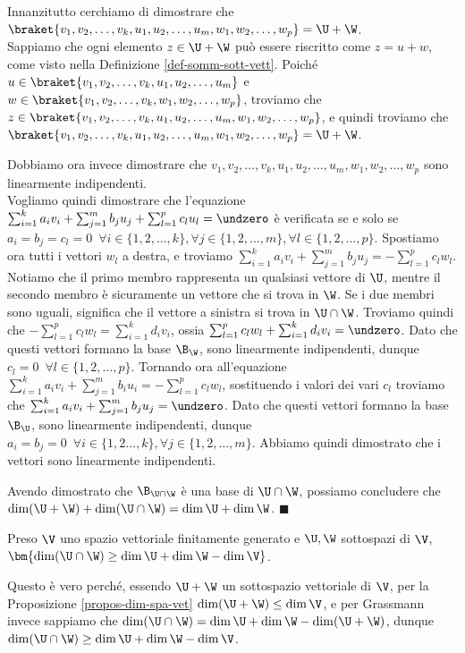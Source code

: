 \documentclass[11pt, a4paper, titlepage, oneside]{scrbook}
\begin{document}
Innanzitutto cerchiamo di dimostrare che $\braket{v_1, v_2, \ldots, v_k, u_1, u_2, \ldots, u_m, w_1, w_2, \ldots, w_p} = \U + \W$.\\
Sappiamo che ogni elemento $z \in \U + \W$ può essere riscritto come $z = u + w$, come visto nella Definizione \ref{def-somm-sott-vett}. Poiché $u \in \braket{v_1, v_2, \ldots, v_k, u_1, u_2, \ldots, u_m}$ e \mbox{$w \in \braket{v_1, v_2, \ldots, v_k, w_1, w_2, \ldots, w_p}$}, troviamo che $z \in \braket{v_1, v_2, \ldots, v_k, u_1, u_2, \ldots, u_m, w_1, w_2, \ldots, w_p}$, e quindi troviamo che \mbox{$\braket{v_1, v_2, \ldots, v_k, u_1, u_2, \ldots, u_m, w_1, w_2, \ldots, w_p} = \U + \W$}.

Dobbiamo ora invece dimostrare che $v_1, v_2, \ldots, v_k, u_1, u_2, \ldots, u_m, w_1, w_2, \ldots, w_p$ sono linearmente indipendenti.\\
Vogliamo quindi dimostrare che l'equazione $\sum_{i = 1}^k a_i v_i + \sum_{j = 1}^m b_j u_j + \sum_{l = 1}^p c_l u_l = \undzero$ è verificata se e solo se $a_i = b_j = c_l = 0 \enspace \forall i \in \{1,2,\ldots,k\},  \forall j \in \{1,2,\ldots,m\},  \forall l \in \{1,2,\ldots,p\}$. Spostiamo ora tutti i vettori $w_l$ a destra, e troviamo $\sum_{i = 1}^k a_i v_i + \sum_{j = 1}^m b_j u_j = -\sum_{l = 1}^p c_l w_l$. Notiamo che il primo membro rappresenta un qualsiasi vettore di $\U$, mentre il secondo membro è sicuramente un vettore che si trova in $\W$. Se i due membri sono uguali, significa che il vettore a sinistra si trova in $\U \cap \W$. 
Troviamo quindi che $-\sum_{l = 1}^p c_l w_l = \sum_{i = 1}^k d_i v_i$, ossia $\sum_{l = 1}^p c_l w_l + \sum_{i = 1}^k d_i v_i = \undzero$. Dato che questi vettori formano la base $\B_{\W}$, sono linearmente indipendenti, dunque $c_l = 0 \enspace \forall l \in \{1,2,\ldots,p\}$. Tornando ora all'equazione $\sum_{i = 1}^k a_i v_i + \sum_{j = 1}^m b_i u_i = -\sum_{l = 1}^p c_l w_l$, sostituendo i valori dei vari $c_l$ troviamo che $\sum_{i = 1}^k a_i v_i + \sum_{j = 1}^m b_j u_j = \undzero$. Dato che questi vettori formano la base $\B_{\U}$, sono linearmente indipendenti, dunque $a_i = b_j = 0 \enspace \forall i \in \{1,2 \ldots, k\}, \forall j \in \{1,2, \ldots, m\}$. Abbiamo quindi dimostrato che i vettori sono linearmente indipendenti.

Avendo dimostrato che $\B_{\U \cap \W}$ è una base di $\U \cap \W$, possiamo concludere che \mbox{$\dim (\U + \W) + \dim (\U \cap \W) = \dim \U + \dim \W$}. $\blacksquare$

\begin{Proposizione}[Corollario]
\label{corol-grassman}
Preso $\V$ uno spazio vettoriale finitamente generato e $\U, \W$ sottospazi di $\V$, \mbox{$\bm{\dim (\U \cap \W) \geq \dim \U + \dim \W - \dim \V}$}.
\end{Proposizione}
Questo è vero perché, essendo $\U + \W$ un sottospazio vettoriale di $\V$, per la Proposizione \ref{propos-dim-spa-vet} \mbox{$\dim (\U + \W) \leq \dim \V$}, e per Grassmann invece sappiamo che \mbox{$\dim (\U \cap \W) = \dim \U + \dim \W - \dim (\U + \W)$}, dunque $\dim (\U \cap \W) \geq \dim \U + \dim \W - \dim \V$.
\end{document}
